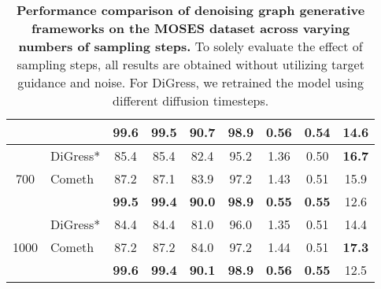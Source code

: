 \begin{table}[h!]
{\begin{tabular}{c|l|ccccccc}
    & \methodname{} & \textbf{99.6} & \textbf{99.5} & \textbf{90.7} & \textbf{98.9} & \textbf{0.56} & 0.54 & 14.6 \\
\midrule
\multirow{3}{*}{700} 
    & DiGress* & 85.4 & 85.4 & 82.4 & 95.2 & 1.36 & 0.50 & \textbf{16.7} \\
    & Cometh & 87.2 & 87.1 & 83.9 & 97.2 & 1.43 & 0.51 & 15.9 \\
    & \methodname{} & \textbf{99.5} & \textbf{99.4} & \textbf{90.0} & \textbf{98.9} & \textbf{0.55} & \textbf{0.55} & 12.6 \\
\midrule
\multirow{3}{*}{1000} 
    & DiGress* & 84.4 & 84.4 & 81.0 & 96.0 & 1.35 & 0.51 & 14.4 \\
    & Cometh & 87.2 & 87.2 & 84.0 & 97.2 & 1.44 & 0.51 & \textbf{17.3} \\
    & \methodname{} & \textbf{99.6} & \textbf{99.4} & \textbf{90.1} & \textbf{98.9} & \textbf{0.56} & \textbf{0.55} & 12.5 \\
\bottomrule
\end{tabular}
}
\caption{\textbf{Performance comparison of denoising graph generative frameworks on the MOSES dataset across varying numbers of sampling steps.} To solely evaluate the effect of sampling steps, all \methodname{} results are obtained without utilizing target guidance and noise. For DiGress, we retrained the model using different diffusion timesteps.}
\label{tab:sample_step}
\end{table}